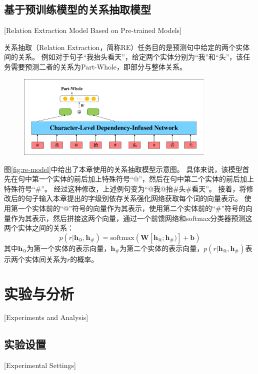 \subsection{基于预训练模型的关系抽取模型}[Relation Extraction Model Based on Pre-trained Models]

关系抽取（Relation Extraction，简称RE）任务目的是预测句中给定的两个实体间的关系。
例如对于句子“我抬头看天”，给定两个实体分别为“我”和“头”，该任务需要预测二者的关系为Part-Whole，即部分与整体关系。

\begin{figure}[hbtp]
	\centering
	\includegraphics[width=0.85\textwidth]{figures/re-model.pdf}
\end{figure}

图\ref{fig:re-model}中给出了本章使用的关系抽取模型示意图。
具体来说，该模型首先在句中第一个实体的前后加上特殊符号“@”，然后在句中第二个实体的前后加上特殊符号“\#”。
经过这种修改，上述例句变为“@我@抬\#头\#看天”。
接着，将修改后的句子输入本章提出的字级别依存关系强化网络获取每个词的向量表示。
使用第一个实体前的“@”符号的向量作为其表示，使用第二个实体前的“\#”符号的向量作为其表示，然后拼接这两个向量，通过一个前馈网络和softmax分类器预测这两个实体之间的关系：
\begin{equation}
    p(r|\bm{h}_{@},\bm{h}_{\#}) = \text{softmax}(\bm{W}[\bm{h}_{@};\bm{h}_{\#})] + \bm{b})
\end{equation}
其中$\bm{h}_{@}$为第一个实体的表示向量，$\bm{h}_{\#}$为第二个实体的表示向量，$ p(r|\bm{h}_{@},\bm{h}_{\#})$表示两个实体间关系为$r$的概率。

\section{实验与分析}[Experiments and Analysis]

\subsection{实验设置}[Experimental Settings]

